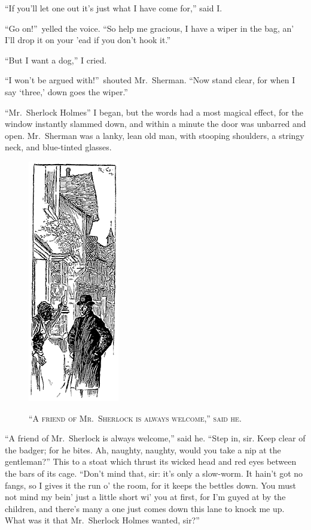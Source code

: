 \documentclass[12pt,english,oneside]{book}
\newcommand{\noun}[1]{\textsc{#1}}
\begin{document}
{}``If you'll let one out it's just what I have come for,'' said
I.

{}``Go on!''\ yelled the voice. {}``So help me gracious, I have
a wiper in the bag, an' I'll drop it on your 'ead if you don't hook
it.''

{}``But I want a dog,'' I cried.

{}``I won't be argued with!''\ shouted Mr.\ Sherman. {}``Now
stand clear, for when I say `three,' down goes the wiper.''

{}``Mr.\ Sherlock Holmes\mdsh{---}'' I began, but the words had
a most magical effect, for the window instantly slammed down, and
within a minute the door was unbarred and open. Mr.\ Sherman was
a lanky, lean old man, with stooping shoulders, a stringy neck, and
blue-tinted glasses.

%
\begin{figure}[htbp]
\noindent \begin{center}\includegraphics{images/sign410-sign-10.png}\end{center}

\noindent \begin{center}\noun{{}``A friend of Mr.\ Sherlock is
always welcome,'' said he.}\end{center}
\end{figure}
{}``A friend of Mr.\ Sherlock is always welcome,'' said he. {}``Step
in, sir. Keep clear of the badger; for he bites. Ah, naughty, naughty,
would you take a nip at the gentleman?'' This to a stoat which thrust
its wicked head and red eyes between the bars of its cage. {}``Don't
mind that, sir: it's only a slow-worm. It hain't got no fangs, so
I gives it the run o' the room, for it keeps the bettles down. You
must not mind my bein' just a little short wi' you at first, for I'm
guyed at by the children, and there's many a one just comes down this
lane to knock me up. What was it that Mr.\ Sherlock Holmes wanted,
sir?''
\end{document}
